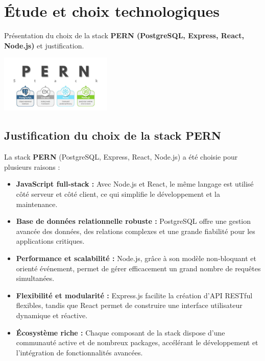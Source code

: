 \documentclass[12pt,a4paper]{report}
\begin{document}
\chapter{Étude et choix technologiques}

Présentation du choix de la stack \textbf{PERN (PostgreSQL, Express, React, Node.js)} et justification.  

\begin{center}
    \includegraphics[width=0.4\textwidth]{1_ptqverAyBpdfUDhrs2g_3A.jpg} %
\end{center}

\section*{Justification du choix de la stack PERN}

La stack \textbf{PERN} (PostgreSQL, Express, React, Node.js) a été choisie pour plusieurs raisons :  

\begin{itemize}
    \item \textbf{JavaScript full-stack :} Avec Node.js et React, le même langage est utilisé côté serveur et côté client, ce qui simplifie le développement et la maintenance.
    \item \textbf{Base de données relationnelle robuste :} PostgreSQL offre une gestion avancée des données, des relations complexes et une grande fiabilité pour les applications critiques.
    \item \textbf{Performance et scalabilité :} Node.js, grâce à son modèle non-bloquant et orienté événement, permet de gérer efficacement un grand nombre de requêtes simultanées.
    \item \textbf{Flexibilité et modularité :} Express.js facilite la création d’API RESTful flexibles, tandis que React permet de construire une interface utilisateur dynamique et réactive.
    \item \textbf{Écosystème riche :} Chaque composant de la stack dispose d’une communauté active et de nombreux packages, accélérant le développement et l’intégration de fonctionnalités avancées.
\end{itemize}
\end{document}
